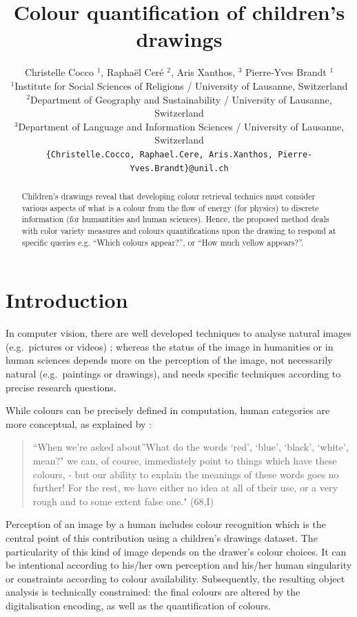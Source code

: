 \documentclass[11pt,a4paper]{article}
\title{Colour quantification of children's drawings}
\author{Christelle Cocco ${}^1$, Rapha\"el Cer\'e ${}^2$, Aris Xanthos, ${}^3$  Pierre-Yves Brandt ${}^1$\\
  ${}^1$Institute for Social Sciences of Religions / University of Lausanne, Switzerland \\
  ${}^2$Department of Geography and Sustainability / University of Lausanne, Switzerland \\
  ${}^3$Department of Language and Information Sciences / University of Lausanne, Switzerland \\
  {\tt \{Christelle.Cocco, Raphael.Cere, Aris.Xanthos, Pierre-Yves.Brandt\}@unil.ch} \\
  }
\date{}
\begin{document}
\maketitle
\begin{abstract}
Children's drawings reveal that developing colour retrieval technics
must consider various aspects of what is a colour from the flow of
energy (for physics) to discrete information (for humantities and human
sciences). Hence, the proposed method deals with color variety measures
and colours quantifications upon the drawing to respond at specific
queries e.g. ``Which colours appear?'', or ``How much yellow appears?''.
\end{abstract}


\section{Introduction}\label{introduction}

In computer vision, there are well developed techniques to analyse
natural images (e.g.~pictures or videos) ; whereas the status of the
image in humanities or in human sciences depends more on the perception
of the image, not necessarily natural (e.g.~paintings or drawings), and
needs specific techniques according to precise research questions.

While colours can be precisely defined in computation, human categories
are more conceptual, as explained by \citep{wittgenstein1978}:

\begin{quote}
``When we're asked about''What do the words `red', `blue', `black',
`white', mean?" we can, of course, immediately point to things which
have these colours, - but our ability to explain the meanings of these
words goes no further! For the rest, we have either no idea at all of
their use, or a very rough and to some extent false one." (68,I)
\end{quote}

Perception of an image by a human includes colour recognition which is
the central point of this contribution using a children's drawings
dataset. The particularity of this kind of image depends on the drawer's
colour choices. It can be intentional according to his/her own
perception and his/her human singularity or constraints according to
colour availability. Subsequently, the resulting object analysis is
technically constrained: the final colours are altered by the
digitalisation encoding, as well as the quantification of colours.
\end{document}
